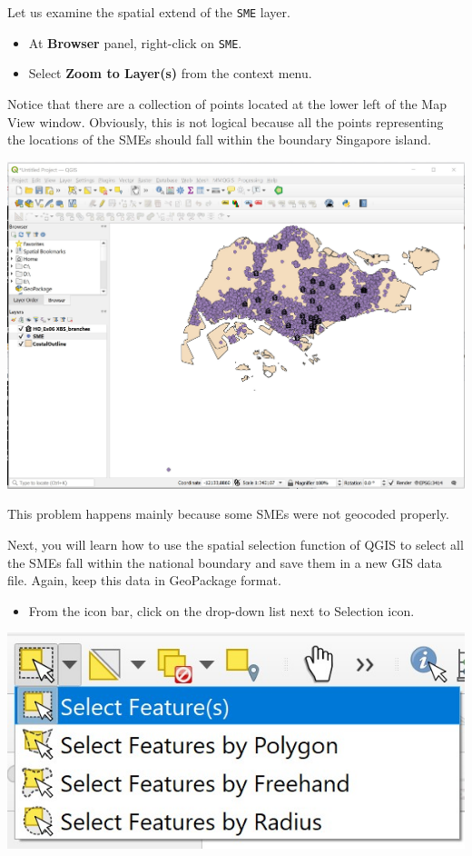\documentclass[
  letterpaper,
  DIV=11,
  numbers=noendperiod]{scrreprt}
\providecommand{\tightlist}{%
  \setlength{\itemsep}{0pt}\setlength{\parskip}{0pt}}\usepackage{longtable,booktabs,array}
\begin{document}
Let us examine the spatial extend of the \texttt{SME} layer.

\begin{itemize}
\tightlist
\item
  At \textbf{Browser} panel, right-click on \texttt{SME}.
\item
  Select \textbf{Zoom to Layer(s)} from the context menu.
\end{itemize}

Notice that there are a collection of points located at the lower left
of the Map View window. Obviously, this is not logical because all the
points representing the locations of the SMEs should fall within the
boundary Singapore island.

\includegraphics{./img05/image9.jpg}

This problem happens mainly because some SMEs were not geocoded
properly.

Next, you will learn how to use the spatial selection function of QGIS
to select all the SMEs fall within the national boundary and save them
in a new GIS data file. Again, keep this data in GeoPackage format.

\begin{itemize}
\tightlist
\item
  From the icon bar, click on the drop-down list next to Selection icon.
\end{itemize}

\includegraphics{./img05/image10.jpg}
\end{document}
